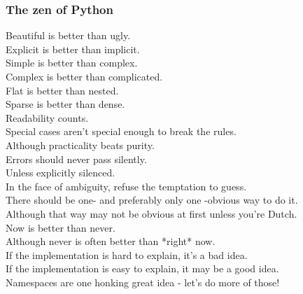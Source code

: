 \documentclass[12pt,t,graphics]{beamer}
\begin{document}
\begin{frame}
	\frametitle{The zen of Python}
	\begin{center}
		\begin{scriptsize}
			Beautiful is better than ugly.\\
			Explicit is better than implicit.\\
			Simple is better than complex.\\
			Complex is better than complicated.\\
			Flat is better than nested.\\
			Sparse is better than dense.\\
			Readability counts.\\
			Special cases aren’t special enough to break the rules.\\
			Although practicality beats purity.\\
			Errors should never pass silently.\\
			Unless explicitly silenced.\\
			In the face of ambiguity, refuse the temptation to guess.\\
			There should be one- and preferably only one -obvious way to do it.\\
			Although that way may not be obvious at first unless you’re Dutch.\\
			Now is better than never.\\
			Although never is often better than *right* now.\\
			If the implementation is hard to explain, it’s a bad idea.\\
			If the implementation is easy to explain, it may be a good idea.\\
			Namespaces are one honking great idea - let’s do more of those!\\
		\end{scriptsize}
	\end{center}
\end{frame}
\end{document}
